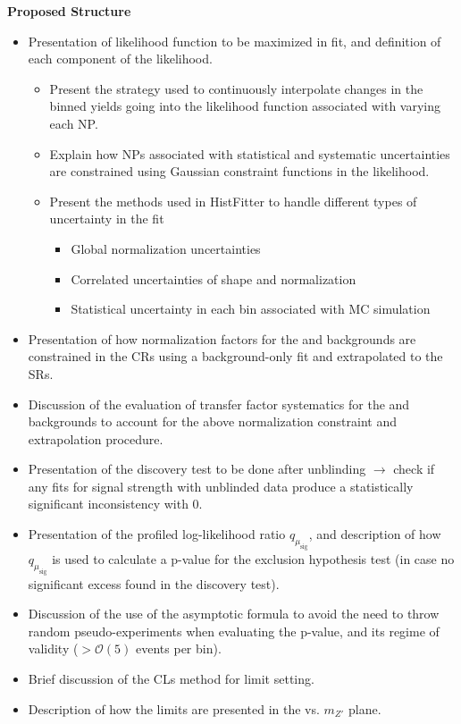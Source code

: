 \begin{description}
\textbf{Proposed Structure}
\begin{itemize}
\item Presentation of likelihood function to be maximized in fit, and definition of each component of the likelihood.
\begin{itemize}
\item Present the strategy used to continuously interpolate changes in the binned yields going into the likelihood function associated with varying each NP.
\item Explain how NPs associated with statistical and systematic uncertainties are constrained using Gaussian constraint functions in the likelihood.
\item Present the methods used in HistFitter to handle different types of uncertainty in the fit
\begin{itemize}
\item Global normalization uncertainties
\item Correlated uncertainties of shape and normalization
\item Statistical uncertainty in each bin associated with MC simulation
\end{itemize}
\end{itemize}
\item Presentation of how normalization factors for the \wjets and \ttbar backgrounds are constrained in the CRs using a background-only fit and extrapolated to the SRs. 
\item Discussion of the evaluation of transfer factor systematics for the \wjets and \ttbar backgrounds to account for the above normalization constraint and extrapolation procedure.
\item Presentation of the discovery test to be done after unblinding $\rightarrow$ check if any fits for signal strength with unblinded data produce a statistically significant inconsistency with 0.
\item Presentation of the profiled log-likelihood ratio $q_{\mu_\text{sig}}$, and description of how $q_{\mu_\text{sig}}$ is used to calculate a p-value for the exclusion hypothesis test (in case no significant excess found in the discovery test).
\item Discussion of the use of the asymptotic formula to avoid the need to throw random pseudo-experiments when evaluating the p-value, and its regime of validity ($>\mathcal{O}(5)$ events per bin).
\item Brief discussion of the CLs method for limit setting.
\item Description of how the limits are presented in the \ms vs. $m_{Z'}$ plane.
\end{itemize}


\end{description}
